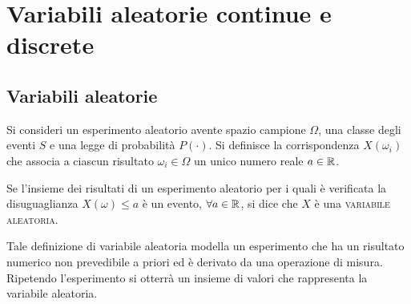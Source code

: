 \chapter{Variabili aleatorie continue e discrete}
\label{ch:teoriasegnali-capitolo5}
\section{Variabili aleatorie}
Si consideri un esperimento aleatorio avente spazio campione $\Omega$, una classe degli eventi $S$ e una legge di probabilità $P(\cdot)$. Si definisce la corrispondenza $X(\omega_i)$ che associa a ciascun risultato $\omega_i\in\Omega$ un unico numero reale $a\in\mathbb{R}$.

Se l'insieme dei risultati di un esperimento aleatorio per i quali è verificata la disuguaglianza $X(\omega)\leq a$ è un evento, $\forall a\in\mathbb{R}$, si dice che $X$ è una \textsc{variabile aleatoria}.

Tale definizione di variabile aleatoria modella un esperimento che ha un risultato numerico non prevedibile a priori ed è derivato da una operazione di misura. Ripetendo l'esperimento si otterrà un insieme di valori che rappresenta la variabile aleatoria.\\

